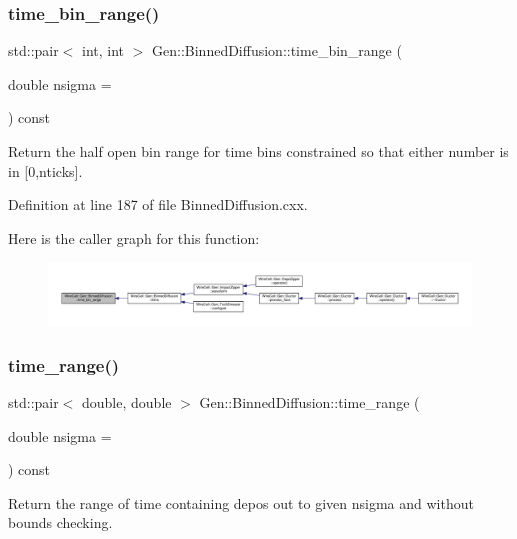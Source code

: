 \subsubsection{\texorpdfstring{time\+\_\+bin\+\_\+range()}{time\_bin\_range()}}
{\footnotesize\ttfamily std\+::pair$<$ int, int $>$ Gen\+::\+Binned\+Diffusion\+::time\+\_\+bin\+\_\+range (\begin{DoxyParamCaption}\item[{double}]{nsigma = {} }\end{DoxyParamCaption}) const}

Return the half open bin range for time bins constrained so that either number is in \mbox{[}0,nticks\mbox{]}. 

Definition at line 187 of file Binned\+Diffusion.\+cxx.

Here is the caller graph for this function\+:
\nopagebreak
\begin{figure}[H]
\begin{center}
\leavevmode
\includegraphics[width=350pt]{class_wire_cell_1_1_gen_1_1_binned_diffusion_a5419eac4bcb3240c4345c9ddc8eb5684_icgraph}
\end{center}
\end{figure}
\mbox{\label{class_wire_cell_1_1_gen_1_1_binned_diffusion_a68d4bec483da54816b4face2f8241fd8}} 
\subsubsection{\texorpdfstring{time\+\_\+range()}{time\_range()}}
{\footnotesize\ttfamily std\+::pair$<$ double, double $>$ Gen\+::\+Binned\+Diffusion\+::time\+\_\+range (\begin{DoxyParamCaption}\item[{double}]{nsigma = {} }\end{DoxyParamCaption}) const}

Return the range of time containing depos out to given nsigma and without bounds checking. 

